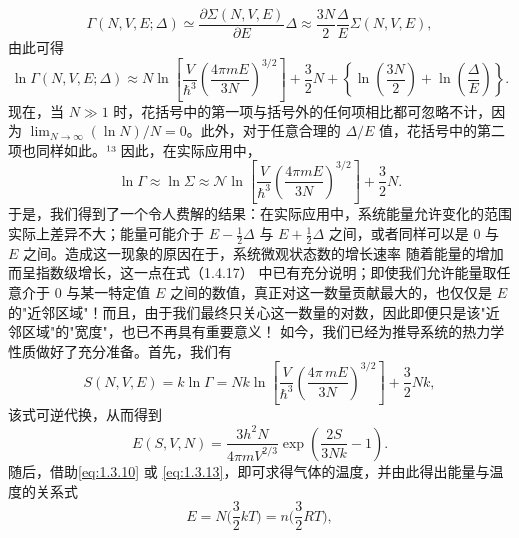 \begin{equation}\tag{1.3.38}\label{eq:1.3.38}
\Gamma ( N , V , E ; \Delta ) \simeq \frac { \partial \Sigma ( N , V , E ) } { \partial E } \Delta \approx \frac { 3 N } { 2 } \frac { \Delta } { E } \Sigma ( N , V , E ) ,
\end{equation}
由此可得
\begin{equation}\tag{1.3.39}\label{eq:1.3.39}
\ln \Gamma ( N , V , E ; \Delta ) \approx N \ln \left[ \frac { V } { \hbar ^{3} } \left( \frac { 4 \pi m E } { 3 N } \right) ^{3 / 2} \right] + \frac { 3 } { 2 } N + \left\{ \ln \left( \frac { 3 N } { 2 } \right) + \ln \left( \frac { \Delta } { E } \right) \right\} .
\end{equation}
现在，当 \(N \gg 1\) 时，花括号中的第一项与括号外的任何项相比都可忽略不计，因为 \(\lim_{N \to \infty} (\ln N)/N = 0\)。此外，对于任意合理的 \(\Delta/E\) 值，花括号中的第二项也同样如此。¹³ 因此，在实际应用中，
\begin{equation}\tag{1.3.40}\label{eq:1.3.40}
\ln \Gamma \approx \ln \Sigma \approx \mathcal { N } \ln \left[ \frac { V } { \hbar ^{3} } \left( \frac { 4 \pi m E } { 3 N } \right) ^{3 / 2} \right] + \frac { 3 } { 2 } N .
\end{equation}
于是，我们得到了一个令人费解的结果：在实际应用中，系统能量允许变化的范围实际上差异不大；能量可能介于 \(E - \frac{1}{2}\Delta\) 与 \(E + \frac{1}{2}\Delta\) 之间，或者同样可以是 0 与 \(E\) 之间。造成这一现象的原因在于，系统微观状态数的增长速率
随着能量的增加而呈指数级增长，这一点在式（1.4.17） 中已有充分说明；即使我们允许能量取任意介于 0 与某一特定值 \(E\) 之间的数值，真正对这一数量贡献最大的，也仅仅是 \(E\) 的"近邻区域"！而且，由于我们最终只关心这一数量的对数，因此即便只是该"近邻区域"的"宽度"，也已不再具有重要意义！
如今，我们已经为推导系统的热力学性质做好了充分准备。首先，我们有
\begin{equation}\tag{1.3.41}\label{eq:1.3.41}
S ( N , V , E ) = k \ln \Gamma = N k \ln \left[ \frac { V } { \hbar ^{3} } \left( \frac { 4 \pi \, m E } { 3 N } \right) ^{3 / 2} \right] + \frac { 3 } { 2 } N k ,
\end{equation}
该式可逆代换，从而得到
\begin{equation}\tag{1.3.42}\label{eq:1.3.42}
E ( S , V , N ) = \frac { 3 h ^{2} N } { 4 \pi m V ^{2 / 3} } \exp \left( \frac { 2 S } { 3 N k } - 1 \right) .
\end{equation}
随后，借助\autoref{eq:1.3.10} 或 \autoref{eq:1.3.13}，即可求得气体的温度，并由此得出能量与温度的关系式
\begin{equation}\tag{1.3.43}\label{eq:1.3.43}
E = N \bigg ( \frac { 3 } { 2 } k T \bigg ) = n \bigg ( \frac { 3 } { 2 } R T \bigg ) ,
\end{equation}
